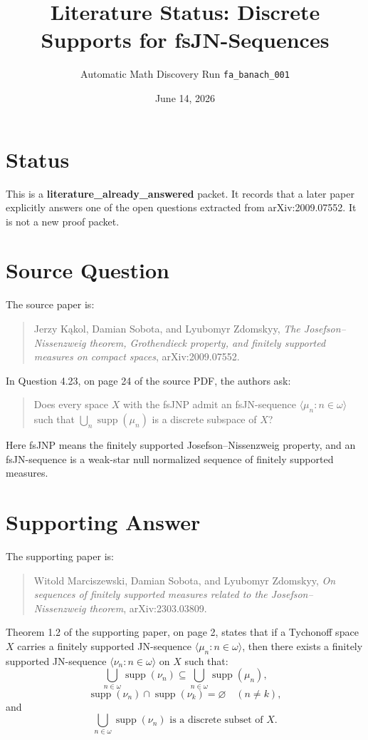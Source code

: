 \documentclass[11pt]{article}
\title{Literature Status: Discrete Supports for fsJN-Sequences}
\author{Automatic Math Discovery Run \texttt{fa\_banach\_001}}
\date{June 14, 2026}
\begin{document}
\maketitle

\section*{Status}

This is a \textbf{literature\_already\_answered} packet.  It records that a
later paper explicitly answers one of the open questions extracted from
arXiv:2009.07552.  It is not a new proof packet.

\section*{Source Question}

The source paper is:

\begin{quote}
Jerzy K\k{a}kol, Damian Sobota, and Lyubomyr Zdomskyy,
\emph{The Josefson--Nissenzweig theorem, Grothendieck property, and finitely
supported measures on compact spaces}, arXiv:2009.07552.
\end{quote}

In Question 4.23, on page 24 of the source PDF, the authors ask:

\begin{quote}
Does every space \(X\) with the fsJNP admit an fsJN-sequence
\(\langle\mu_n:n\in\omega\rangle\) such that
\(\bigcup_n \operatorname{supp}(\mu_n)\) is a discrete subspace of \(X\)?
\end{quote}

Here fsJNP means the finitely supported Josefson--Nissenzweig property, and an
fsJN-sequence is a weak-star null normalized sequence of finitely supported
measures.

\section*{Supporting Answer}

The supporting paper is:

\begin{quote}
Witold Marciszewski, Damian Sobota, and Lyubomyr Zdomskyy,
\emph{On sequences of finitely supported measures related to the
Josefson--Nissenzweig theorem}, arXiv:2303.03809.
\end{quote}

Theorem 1.2 of the supporting paper, on page 2, states that if a Tychonoff
space \(X\) carries a finitely supported JN-sequence
\(\langle\mu_n:n\in\omega\rangle\), then there exists a finitely supported
JN-sequence \(\langle\nu_n:n\in\omega\rangle\) on \(X\) such that:
\[
  \bigcup_{n\in\omega}\operatorname{supp}(\nu_n)
  \subseteq
  \bigcup_{n\in\omega}\operatorname{supp}(\mu_n),
\]
\[
  \operatorname{supp}(\nu_n)\cap\operatorname{supp}(\nu_k)=\varnothing
  \quad(n\neq k),
\]
and
\[
  \bigcup_{n\in\omega}\operatorname{supp}(\nu_n)
  \text{ is a discrete subset of }X.
\]
\end{document}
